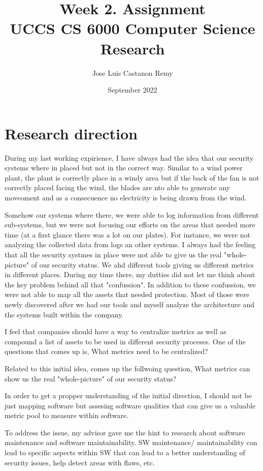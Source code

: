 \documentclass[article]{IEEEtran}
\title{Week 2. Assignment \\
\large UCCS CS 6000 Computer Science Research}
\author{Jose Luis Castanon Remy}
\date{September 2022}
\begin{document}
\maketitle




\section{Research direction}
During my last working expirience, I have always had the idea that our security systems where in placed but not in the correct way. Similar to a wind power plant, the plant is correctly place in a windy area but if the back of the fan is not correctly placed facing the wind, the blades are nto able to generate any moveoment and as a consecuence no electricity is being drawn from the wind.

Somehow our systems where there, we were able to log information from different sub-systems, but we were not focusing our efforts on the areas that needed more time (at a first glance there was a lot on our plates). For instance, we were not analyzing the collected data from logs an other systems. I always had the feeling that all the security systmes in place were not able to give us the real "whole-picture" of our security status. We ahd different tools giving us different metrics in different places. During my time there, my dutties did not let me think about the key problem behind all that "confussion". In addition to these confussion, we were not able to map all the assets that needed protection. Most of those were newly discovered after we had our tools and myself analyze the architecture and the systems built within the company. 

I feel that companies should have a way to centralize metrics as well as compound a list of assets to be used in different security proceses. One of the questions that comes up is, What metrics need to be centralized? 

Related to this initial idea, comes up the follwoing question, What metrics can show us the real "whole-picture" of our security status? 

In order to get a propper understanding of the initial  direction, I should not be just mapping software but assesing software qualities that can give us a valuable metric pool to measure within software. 

To address the issue, my advisor gave me the hint to research about software maintenance and software maintainability. SW maintenance/ maintainability can lead to specific aspects within SW that can lead to a better understanding of security issues, help detect areas with flaws, etc.
\end{document}
